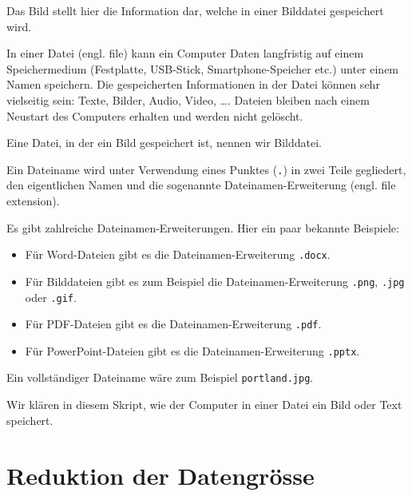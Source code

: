 
Das Bild stellt hier die Information dar, welche in einer Bilddatei gespeichert wird.

\begin{definition}[Datei]
In einer Datei (engl. file) kann ein Computer Daten langfristig auf einem Speichermedium (Festplatte, USB-Stick, Smartphone-Speicher etc.) unter einem Namen speichern. Die gespeicherten Informationen in der Datei können sehr vielseitig sein: Texte, Bilder, Audio, Video, \dots . Dateien bleiben nach einem Neustart des Computers erhalten und werden nicht gelöscht.
\end{definition}

\begin{definition}[Bilddatei]
Eine Datei, in der ein Bild gespeichert ist, nennen wir Bilddatei.
\end{definition}

\begin{definition}
Ein Dateiname wird unter Verwendung eines Punktes (\texttt{.}) in zwei Teile gegliedert, den eigentlichen Namen und die sogenannte Dateinamen-Erweiterung (engl. file extension).
\end{definition}

\begin{example}
Es gibt zahlreiche Dateinamen-Erweiterungen. Hier ein paar bekannte Beispiele:
\begin{itemize}
\item Für Word-Dateien gibt es die Dateinamen-Erweiterung \texttt{.docx}.
\item Für Bilddateien gibt es zum Beispiel die Dateinamen-Erweiterung \texttt{.png}, \texttt{.jpg} oder \texttt{.gif}.
\item Für PDF-Dateien gibt es die Dateinamen-Erweiterung \texttt{.pdf}.
\item Für PowerPoint-Dateien gibt es die Dateinamen-Erweiterung \texttt{.pptx}.
\end{itemize}
Ein vollständiger Dateiname wäre zum Beispiel \texttt{portland.jpg}.
\end{example}

Wir klären in diesem Skript, wie der Computer in einer Datei ein Bild oder Text speichert.

\section{Reduktion der Datengrösse}

